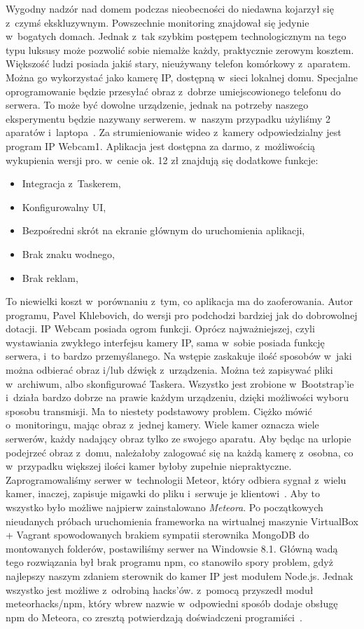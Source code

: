 \documentclass{xmgr}
\begin{document}
	Wygodny nadzór nad domem podczas nieobecności do niedawna kojarzył się z~czymś ekskluzywnym. Powszechnie monitoring znajdował się jedynie w~bogatych domach. Jednak z~tak szybkim postępem technologicznym na tego typu luksusy może pozwolić sobie niemalże każdy, praktycznie zerowym kosztem. Większość ludzi posiada jakiś stary, nieużywany telefon komórkowy z~aparatem. Można go wykorzystać jako kamerę IP, dostępną w~sieci lokalnej domu. Specjalne oprogramowanie będzie przesyłać obraz z~dobrze umiejscowionego telefonu do serwera. To może być dowolne urządzenie, jednak na potrzeby naszego eksperymentu będzie nazywany serwerem. w~naszym przypadku użyliśmy 2 aparatów i~laptopa~\cite{Learning}.
	Za strumieniowanie wideo z~kamery odpowiedzialny jest program IP Webcam1. Aplikacja jest dostępna za darmo, z~możliwością wykupienia wersji pro. w~cenie ok. 12 zł znajdują się dodatkowe funkcje:
\begin{itemize}
\item Integracja z~Taskerem,
\item Konfigurowalny UI,
\item Bezpośredni skrót na ekranie głównym do uruchomienia aplikacji,
\item Brak znaku wodnego,
\item Brak reklam,
\end{itemize}
	To niewielki koszt w~porównaniu z~tym, co aplikacja ma do zaoferowania. Autor programu, Pavel Khlebovich, do wersji pro  podchodzi bardziej jak do dobrowolnej dotacji.
	IP Webcam posiada ogrom funkcji. Oprócz najważniejszej, czyli wystawiania zwykłego interfejsu kamery IP, sama w~sobie posiada funkcję serwera, i~to bardzo przemyślanego. Na wstępie zaskakuje ilość sposobów w~jaki można odbierać obraz i/lub dźwięk z~urządzenia. Można też zapisywać pliki w~archiwum, albo skonfigurować Taskera. Wszystko jest zrobione w~Bootstrap'ie i~działa bardzo dobrze na prawie każdym urządzeniu, dzięki możliwości wyboru sposobu transmisji.
	Ma to niestety podstawowy problem. Ciężko mówić o~monitoringu, mając obraz z~jednej kamery. Wiele kamer oznacza wiele serwerów, każdy nadający obraz tylko ze swojego aparatu. Aby będąc na urlopie podejrzeć obraz z~domu, należałoby zalogować się na każdą kamerę z~osobna, co w~przypadku większej ilości kamer byłoby zupełnie niepraktyczne. Zaprogramowaliśmy serwer w~technologii Meteor, który odbiera sygnał z~wielu kamer, inaczej, zapisuje migawki do pliku i~serwuje je klientowi~\cite{Started}.
	Aby to wszystko było możliwe najpierw zainstalowano \emph{Meteora}. Po początkowych nieudanych próbach uruchomienia frameworka na wirtualnej maszynie VirtualBox + Vagrant spowodowanych brakiem sympatii sterownika MongoDB do montowanych folderów, postawiliśmy serwer na Windowsie 8.1. Główną wadą tego rozwiązania był brak programu npm, co stanowiło spory problem, gdyż najlepszy naszym zdaniem sterownik do kamer IP jest modułem Node.js. Jednak wszystko jest możliwe z~odrobiną hacks'ów. z~pomocą przyszedł moduł meteorhacks/npm, który wbrew nazwie w~odpowiedni sposób dodaje obsługę npm do Meteora, co zresztą potwierdzają doświadczeni programiści~\cite{Npm:2014:CMC}.
\end{document}
